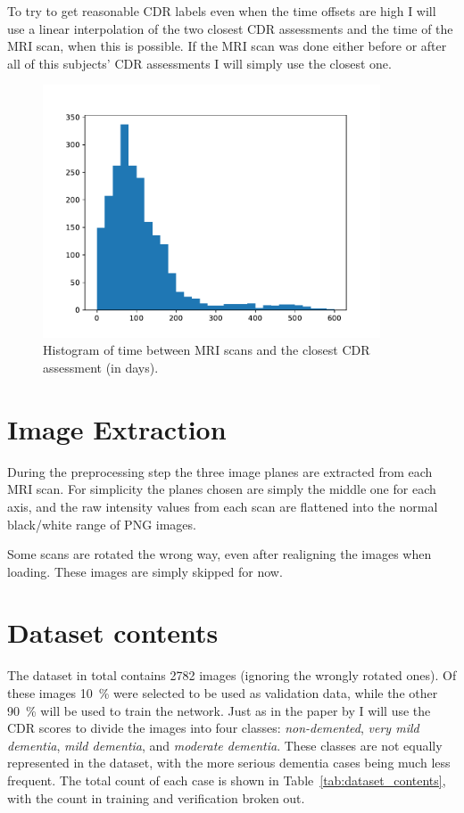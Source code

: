 \documentclass{kththesis}
\begin{document}
To try to get reasonable CDR labels even when the time offsets are high I will use a linear interpolation of the two closest CDR assessments and the time of the MRI scan, when this is possible. If the MRI scan was done either before or after all of this subjects' CDR assessments I will simply use the closest one.

\begin{figure}
  \begin{center}
    \includegraphics[width=100mm]{img/mri_cdr_offset.pdf}
    \caption{Histogram of time between MRI scans and the closest CDR assessment (in days).}
    \label{fig:mri_cdr_offset}
  \end{center}
\end{figure}

\section{Image Extraction}
During the preprocessing step the three image planes are extracted from each MRI scan. For simplicity the planes chosen are simply the middle one for each axis, and the raw intensity values from each scan are flattened into the normal black/white range of PNG images.

Some scans are rotated the wrong way, even after realigning the images when loading. These images are simply skipped for now.

\section{Dataset contents}
The dataset in total contains 2782 images (ignoring the wrongly rotated ones). Of these images 10~\% were selected to be used as validation data, while the other 90~\% will be used to train the network. Just as in the paper by \textcite{islam2018early} I will use the CDR scores to divide the images into four classes: \textit{non-demented}, \textit{very mild dementia}, \textit{mild dementia}, and \textit{moderate dementia}. These classes are not equally represented in the dataset, with the more serious dementia cases being much less frequent. The total count of each case is shown in Table~\ref{tab:dataset_contents}, with the count in training and verification broken out.
\end{document}
